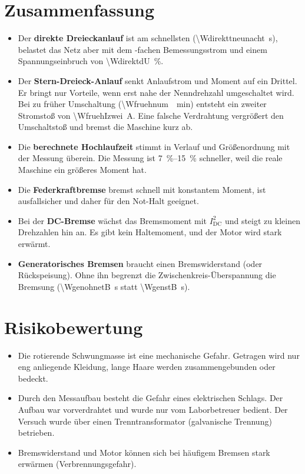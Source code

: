 \documentclass[11pt,a4paper]{article}
\begin{document}
\section{Zusammenfassung}
\begin{itemize}
\item Der \textbf{direkte Dreieckanlauf} ist am schnellsten (\SI{\Wdirekttneunacht}{s}), belastet das
      Netz aber mit dem \WdirektIN-fachen Bemessungsstrom und einem Spannungseinbruch von
      \SI{\WdirektdU}{\percent}.
\item Der \textbf{Stern-Dreieck-Anlauf} senkt Anlaufstrom und Moment auf ein Drittel. Er
      bringt nur Vorteile, wenn erst nahe der Nenndrehzahl umgeschaltet wird. Bei zu früher
      Umschaltung (\SI{\Wfruehnum}{\per\minute}) entsteht ein zweiter Stromstoß von
      \SI{\WfruehIzwei}{A}. Eine falsche Verdrahtung vergrößert den Umschaltstoß und bremst
      die Maschine kurz ab.
\item Die \textbf{berechnete Hochlaufzeit} stimmt in Verlauf und Größenordnung mit der
      Messung überein. Die Messung ist \SIrange{7}{15}{\percent} schneller, weil die reale
      Maschine ein größeres Moment hat.
\item Die \textbf{Federkraftbremse} bremst schnell mit konstantem Moment, ist ausfallsicher
      und daher für den Not-Halt geeignet.
\item Bei der \textbf{DC-Bremse} wächst das Bremsmoment mit $I_\mathrm{DC}^2$ und steigt zu kleinen
      Drehzahlen hin an. Es gibt kein Haltemoment, und der Motor wird stark erwärmt.
\item \textbf{Generatorisches Bremsen} braucht einen Bremswiderstand (oder Rückspeisung).
      Ohne ihn begrenzt die Zwischenkreis-Überspannung die Bremsung (\SI{\WgenohnetB}{s} statt
      \SI{\WgenstB}{s}).
\end{itemize}

\section{Risikobewertung}
\begin{itemize}
\item Die rotierende Schwungmasse ist eine mechanische Gefahr. Getragen wird nur eng
      anliegende Kleidung, lange Haare werden zusammengebunden oder bedeckt.
\item Durch den Messaufbau besteht die Gefahr eines elektrischen Schlags. Der Aufbau war vorverdrahtet
      und wurde nur vom Laborbetreuer bedient. Der Versuch wurde über einen Trenntransformator
      (galvanische Trennung) betrieben.
\item Bremswiderstand und Motor können sich bei häufigem Bremsen stark erwärmen
      (Verbrennungsgefahr).
\end{itemize}
\end{document}
